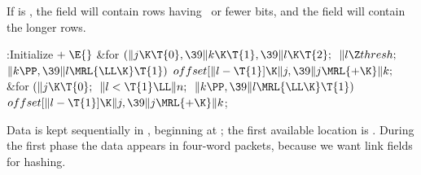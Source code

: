 If  is , the 
field will contain rows having
~or fewer bits, and the  field will contain the longer
rows.

\fi

\B{}:Initialize\X${}\mathrel+\E{}$\6
\&{for} ${}(\|j\K\T{0},\39\|k\K\T{1},\39\|l\K\T{2};{}$ ${}\|l\Z\\{thresh};{}$
${}\|k\PP,\39\|l\MRL{{\LL}{\K}}\T{1}){}$\1\5
${}\\{offset}[\|l-\T{1}]\K\|j,\39\|j\MRL{+{\K}}\|k;{}$\2\6
\&{for} ${}(\|j\K\T{0};{}$ ${}\|l<\T{1}\LL\|n;{}$ ${}\|k\PP,\39\|l\MRL{{\LL}{%
\K}}\T{1}){}$\1\5
${}\\{offset}[\|l-\T{1}]\K\|j,\39\|j\MRL{+{\K}}\|k{}$;\2\par
\fi

Data is kept sequentially in , beginning at ; the first
available location is . During the first phase the data appears
in four-word packets, because we want link fields for hashing.


